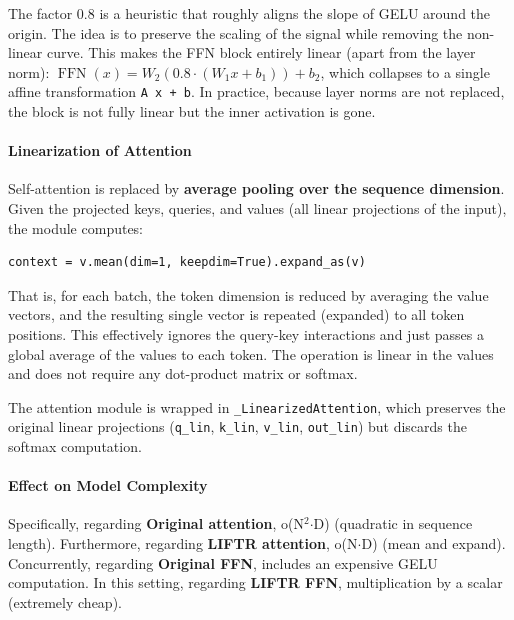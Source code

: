 The factor 0.8 is a heuristic that roughly aligns the slope of GELU around the origin. The idea is to preserve the scaling of the signal while removing the non-linear curve. This makes the FFN block entirely linear (apart from the layer norm): $\operatorname{FFN}(x) = W_2 (0.8 \cdot (W_1 x + b_1)) + b_2$, which collapses to a single affine transformation \texttt{A x + b}. In practice, because layer norms are not replaced, the block is not fully linear but the inner activation is gone.

\paragraph{Linearization of Attention}

Self-attention is replaced by \textbf{average pooling over the sequence dimension}. Given the projected keys, queries, and values (all linear projections of the input), the module computes:

\vspace{0.5em}
\begin{mdframed}[backgroundcolor=codebg, linecolor=codeframe, linewidth=1pt, roundcorner=4pt, innerleftmargin=2pt, innerrightmargin=5pt, innertopmargin=5pt, innerbottommargin=5pt]
\begin{lstlisting}
context = v.mean(dim=1, keepdim=True).expand_as(v)
\end{lstlisting}
\end{mdframed}
\vspace{0.5em}

That is, for each batch, the token dimension is reduced by averaging the value vectors, and the resulting single vector is repeated (expanded) to all token positions. This effectively ignores the query-key interactions and just passes a global average of the values to each token. The operation is linear in the values and does not require any dot-product matrix or softmax.

The attention module is wrapped in \texttt{\_LinearizedAttention}, which preserves the original linear projections (\texttt{q\_lin}, \texttt{k\_lin}, \texttt{v\_lin}, \texttt{out\_lin}) but discards the softmax computation.

\paragraph{Effect on Model Complexity}

Specifically, regarding \textbf{Original attention}, o(N$^2$$\cdot$D) (quadratic in sequence length). Furthermore, regarding \textbf{LIFTR attention}, o(N$\cdot$D) (mean and expand). Concurrently, regarding \textbf{Original FFN}, includes an expensive GELU computation. In this setting, regarding \textbf{LIFTR FFN}, multiplication by a scalar (extremely cheap).


